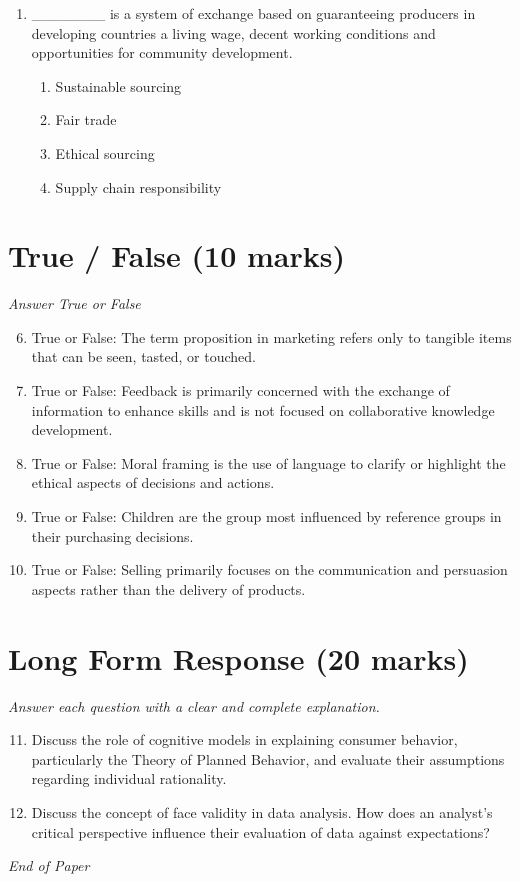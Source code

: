 \documentclass[12pt]{article}
\begin{document}
\begin{enumerate}[label=\arabic*.]
\begin{enumerate}[label=(\alph*)]
    \item Personality conflicts
\end{enumerate}
\item \_\_\_\_\_\_\_ is a system of exchange based on guaranteeing producers in developing countries a living wage, decent working conditions and opportunities for community development.
\begin{enumerate}[label=(\alph*)]
    \item Sustainable sourcing
    \item Fair trade
    \item Ethical sourcing
    \item Supply chain responsibility
\end{enumerate}
\end{enumerate}

\section*{True / False (10 marks)}
\textit{Answer True or False}
\begin{enumerate}[label=\arabic*.]
\setcounter{enumi}{5}
\item True or False: The term proposition in marketing refers only to tangible items that can be seen, tasted, or touched.
\item True or False: Feedback is primarily concerned with the exchange of information to enhance skills and is not focused on collaborative knowledge development.
\item True or False: Moral framing is the use of language to clarify or highlight the ethical aspects of decisions and actions.
\item True or False: Children are the group most influenced by reference groups in their purchasing decisions.
\item True or False: Selling primarily focuses on the communication and persuasion aspects rather than the delivery of products.
\end{enumerate}

\section*{Long Form Response (20 marks)}
\textit{Answer each question with a clear and complete explanation.}
\begin{enumerate}[label=\arabic*.]
\setcounter{enumi}{10}
\item Discuss the role of cognitive models in explaining consumer behavior, particularly the Theory of Planned Behavior, and evaluate their assumptions regarding individual rationality.
\item Discuss the concept of face validity in data analysis. How does an analyst's critical perspective influence their evaluation of data against expectations?
\end{enumerate}

\vfill
\noindent\textit{End of Paper}
\end{document}
